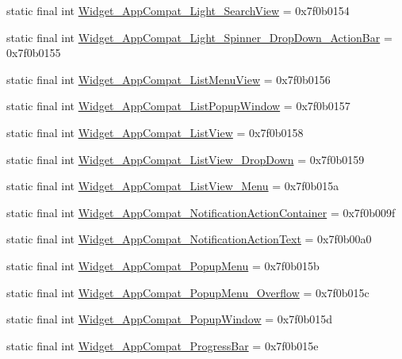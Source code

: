 \begin{CompactItemize}
\item 
static final int \hyperlink{classandroid_1_1support_1_1v4_1_1_r_1_1style_d675d04a6f4e3b1c5df141b03a9b5004}{Widget\_\-AppCompat\_\-Light\_\-SearchView} = 0x7f0b0154
\item 
static final int \hyperlink{classandroid_1_1support_1_1v4_1_1_r_1_1style_ccad884c9d052a1d641822dc5f5645d1}{Widget\_\-AppCompat\_\-Light\_\-Spinner\_\-DropDown\_\-ActionBar} = 0x7f0b0155
\item 
static final int \hyperlink{classandroid_1_1support_1_1v4_1_1_r_1_1style_4702be8412c159b9f6566149eb1d9847}{Widget\_\-AppCompat\_\-ListMenuView} = 0x7f0b0156
\item 
static final int \hyperlink{classandroid_1_1support_1_1v4_1_1_r_1_1style_b6ea03f9c2561eff8d0c3689c5fb6c2a}{Widget\_\-AppCompat\_\-ListPopupWindow} = 0x7f0b0157
\item 
static final int \hyperlink{classandroid_1_1support_1_1v4_1_1_r_1_1style_81728bb303814b986aa6c4b354304af3}{Widget\_\-AppCompat\_\-ListView} = 0x7f0b0158
\item 
static final int \hyperlink{classandroid_1_1support_1_1v4_1_1_r_1_1style_6903aca949c81763892d39c0954504b7}{Widget\_\-AppCompat\_\-ListView\_\-DropDown} = 0x7f0b0159
\item 
static final int \hyperlink{classandroid_1_1support_1_1v4_1_1_r_1_1style_90534496dfe585807af35d3c02602127}{Widget\_\-AppCompat\_\-ListView\_\-Menu} = 0x7f0b015a
\item 
static final int \hyperlink{classandroid_1_1support_1_1v4_1_1_r_1_1style_35b92f289af21f789e620a6a3947a479}{Widget\_\-AppCompat\_\-NotificationActionContainer} = 0x7f0b009f
\item 
static final int \hyperlink{classandroid_1_1support_1_1v4_1_1_r_1_1style_4b12ad800bf83ab9b3a21723ec20a86c}{Widget\_\-AppCompat\_\-NotificationActionText} = 0x7f0b00a0
\item 
static final int \hyperlink{classandroid_1_1support_1_1v4_1_1_r_1_1style_8c7eddfd0fc4be8c41fb1a68a3bde644}{Widget\_\-AppCompat\_\-PopupMenu} = 0x7f0b015b
\item 
static final int \hyperlink{classandroid_1_1support_1_1v4_1_1_r_1_1style_9d69bad2d461f2de8be7d6f394613d3e}{Widget\_\-AppCompat\_\-PopupMenu\_\-Overflow} = 0x7f0b015c
\item 
static final int \hyperlink{classandroid_1_1support_1_1v4_1_1_r_1_1style_d425900a7401a042c1ff967d12a51a43}{Widget\_\-AppCompat\_\-PopupWindow} = 0x7f0b015d
\item 
static final int \hyperlink{classandroid_1_1support_1_1v4_1_1_r_1_1style_a08a8265b82137dc2658e9c3bd7e05a2}{Widget\_\-AppCompat\_\-ProgressBar} = 0x7f0b015e

\end{CompactItemize}
